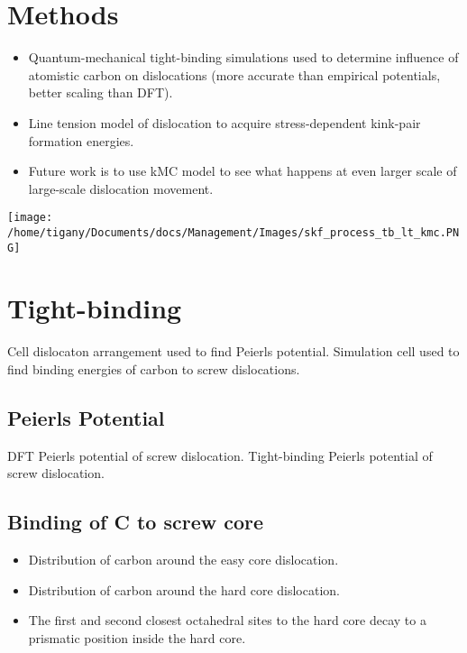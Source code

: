 \documentclass[11pt]{article}
\begin{document}
\section*{Methods}
\label{sec:org29ec1b3}
\begin{itemize}
\item Quantum-mechanical tight-binding simulations used to determine
influence of atomistic carbon on dislocations (more accurate than
empirical potentials, better scaling than DFT).
\item Line tension model of dislocation to acquire stress-dependent
kink-pair formation energies.
\item Future work is to use kMC model to see what happens at even larger
scale of large-scale dislocation movement.
\end{itemize}
\begin{center}
\texttt{[image: /home/tigany/Documents/docs/Management/Images/skf\_process\_tb\_lt\_kmc.PNG]}
\label{org61f731b}
\end{center}


\section*{Tight-binding}
\label{sec:org9b29a0b}
Cell dislocaton arrangement used to find Peierls potential.
Simulation cell used to find binding energies of carbon to screw dislocations.




\subsection*{Peierls Potential}
\label{sec:org8b7656c}
DFT Peierls potential of screw dislocation.
Tight-binding Peierls potential of screw dislocation.



\subsection*{Binding of C to screw core}
\label{sec:orgeef6e51}

\begin{itemize}
\item Distribution of carbon around the easy core dislocation.
\end{itemize}
\begin{itemize}
\item Distribution of carbon around the hard core dislocation.
\item The first and second closest octahedral sites to the hard core decay to a prismatic position inside the hard core.
\end{itemize}
\end{document}
